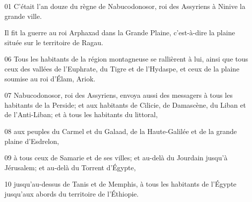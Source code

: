 01 C’était l'an douze du règne de Nabucodonosor, roi des Assyriens à Ninive la grande ville.

Il fit la guerre au roi Arphaxad dans la Grande Plaine, c'est-à-dire la plaine située sur le territoire de Ragau.

06 Tous les habitants de la région montagneuse se rallièrent à lui, ainsi que tous ceux des vallées de l'Euphrate, du Tigre et de l'Hydaspe, et ceux de la plaine soumise au roi d'Élam, Ariok.

07 Nabucodonosor, roi des Assyriens, envoya aussi des messagers à tous les habitants de la Perside; et aux habitants de Cilicie, de Damascène, du Liban et de l'Anti-Liban; et à tous les habitants du littoral,

08 aux peuples du Carmel et du Galaad, de la Haute-Galilée et de la grande plaine d'Esdrelon,

09 à tous ceux de Samarie et de ses villes; et au-delà du Jourdain jusqu'à Jérusalem; et au-delà du Torrent d'Égypte,

10 jusqu'au-dessus de Tanis et de Memphis, à tous les habitants de l'Égypte jusqu'aux abords du territoire de l'Éthiopie.

